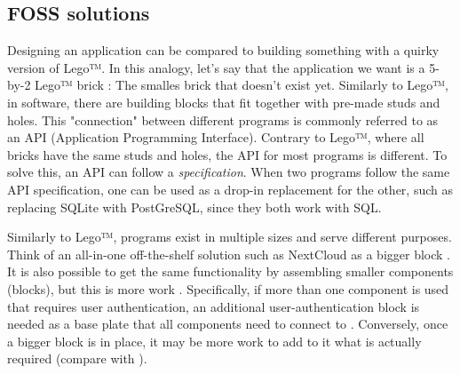 \documentclass[journal, dvipsnames]{IEEEtran}
\begin{document}
\subsection{FOSS solutions}\label{sum_e2ePresentation}

Designing an application can be compared to building something with a quirky version of Lego™. In this analogy, let's say that the application we want is a 5-by-2 Lego™ brick
: The smalles brick that doesn't exist yet. Similarly to Lego™, in software, there are building blocks that fit together with pre-made studs and holes. This "connection" between different programs is commonly referred to as an API (Application Programming Interface). Contrary to Lego™, where all bricks have the same studs and holes, the API for most programs is different. To solve this, an API can follow a \textit{specification}. When two programs follow the same API specification, one can be used as a drop-in replacement for the other, such as replacing SQLite with PostGreSQL, since they both work with SQL.

Similarly to Lego™, programs exist in multiple sizes and serve different purposes. Think of an all-in-one off-the-shelf solution such as NextCloud as a bigger block 
. It is also possible to get the same functionality by assembling smaller components (blocks), but this is more work
. Specifically, if more than one component is used that requires user authentication, an additional user-authentication block is needed as a base plate that all components need to connect to
.
Conversely, once a bigger block is in place, it may be more work to add to it what is actually required (compare 
 with ).
\end{document}
